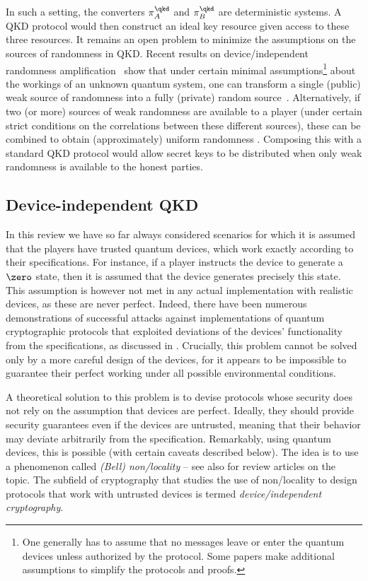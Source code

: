 In such a setting, the converters $\pi^{\qkd}_A$ and $\pi^{\qkd}_B$
are deterministic systems. A QKD protocol would then construct an
ideal key resource given access to these three resources. It remains
an open problem to minimize the assumptions on the sources of
randomness in QKD. Recent results on device\-/independent randomness
amplification~\cite{CR12} show that under certain minimal assumptions\footnote{One
  generally has to assume that no messages leave or enter the quantum
  devices unless authorized by the protocol. Some papers make
  additional assumptions to simplify the protocols and proofs.} about
the workings of an unknown quantum system, one can transform a single
(public) weak source of randomness into a fully (private) random
source~\cite{CSW14,BRGHHHSW16,KAF20}. Alternatively, if two (or more)
sources of weak randomness are available to a player (under certain
strict conditions on the correlations between these different
sources), these can be combined to obtain (approximately) uniform
randomness \cite{CLW14,AFPS16}. Composing this with a standard QKD
protocol would allow secret keys to be distributed when only weak
randomness is available to the honest parties.


\subsection{Device-independent QKD}
\label{sec:alternative.di}

In this review we have so far always considered scenarios for which it
is assumed that the players have trusted quantum devices, which work
exactly according to their specifications. For instance, if a player
instructs the device to generate a $\zero$ state, then it is assumed
that the device generates precisely this state. This assumption is
however not met in any actual implementation with realistic devices,
as these are never perfect. Indeed, there have been numerous
demonstrations of successful attacks against implementations of
quantum cryptographic protocols that exploited deviations of the
devices' functionality from the specifications, as discussed in
. Crucially, this problem cannot be solved only by
a more careful design of the devices, for it appears to be impossible
to guarantee their perfect working under all possible environmental
conditions.

A theoretical solution to this problem is to devise protocols whose
security does not rely on the assumption that devices are perfect.
Ideally, they should provide security guarantees even if the devices
are untrusted, meaning that their behavior may deviate arbitrarily
from the specification. Remarkably, using quantum devices, this is
possible (with certain caveats described below). The idea is to use a
phenomenon called \emph{(Bell) non\-/locality} \cite{Bell64} \--- see
also \textcite{Sca13,BCPSW14} for review articles on the topic. The
subfield of cryptography that studies the use of non\-/locality to
design protocols that work with untrusted devices is termed
\emph{device\-/independent cryptography}.
  
